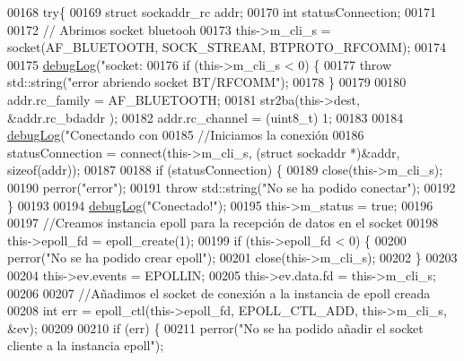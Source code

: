 \begin{DoxyCode}
{{{{00168         \textcolor{keywordflow}{try}\{
00169             \textcolor{keyword}{struct }sockaddr\_rc addr;
00170             \textcolor{keywordtype}{int} statusConnection;
00171 
00172             \textcolor{comment}{// Abrimos socket bluetooh}
00173             this->m\_cli\_s = socket(AF\_BLUETOOTH, SOCK\_STREAM, BTPROTO\_RFCOMM);
00174 
00175             \hyperlink{debug_8hpp_a55f41cf7b0585224496de3d7adbc101c}{debugLog}(\textcolor{stringliteral}{"socket: %
00176             \textcolor{keywordflow}{if} (this->m\_cli\_s < 0) \{
00177                 \textcolor{keywordflow}{throw} std::string(\textcolor{stringliteral}{"error abriendo socket BT/RFCOMM"});
00178             \}
00179 
00180             addr.rc\_family = AF\_BLUETOOTH;
00181             str2ba(this->dest, &addr.rc\_bdaddr );
00182             addr.rc\_channel = (uint8\_t) 1;
00183 
00184             \hyperlink{debug_8hpp_a55f41cf7b0585224496de3d7adbc101c}{debugLog}(\textcolor{stringliteral}{"Conectando con %
00185             \textcolor{comment}{//Iniciamos la conexión}
00186             statusConnection = connect(this->m\_cli\_s, (\textcolor{keyword}{struct} sockaddr *)&addr, \textcolor{keyword}{sizeof}(addr));
00187 
00188             \textcolor{keywordflow}{if} (statusConnection) \{
00189                 close(this->m\_cli\_s);
00190                 perror(\textcolor{stringliteral}{"error"});
00191                 \textcolor{keywordflow}{throw} std::string(\textcolor{stringliteral}{"No se ha podido conectar"});
00192             \}
00193 
00194             \hyperlink{debug_8hpp_a55f41cf7b0585224496de3d7adbc101c}{debugLog}(\textcolor{stringliteral}{"Conectado!"});
00195             this->m\_status = \textcolor{keyword}{true};
00196 
00197             \textcolor{comment}{//Creamos instancia epoll para la recepción de datos en el socket}
00198             this->epoll\_fd = epoll\_create(1);
00199             \textcolor{keywordflow}{if} (this->epoll\_fd < 0) \{
00200                 perror(\textcolor{stringliteral}{"No se ha podido crear epoll"});
00201                 close(this->m\_cli\_s);
00202             \}
00203 
00204             this->ev.events = EPOLLIN;
00205             this->ev.data.fd = this->m\_cli\_s;
00206 
00207             \textcolor{comment}{//Añadimos el socket de conexión a la instancia de epoll creada}
00208             \textcolor{keywordtype}{int} err = epoll\_ctl(this->epoll\_fd, EPOLL\_CTL\_ADD, this->m\_cli\_s, &ev);
00209             
00210             \textcolor{keywordflow}{if} (err) \{
00211                 perror(\textcolor{stringliteral}{"No se ha podido añadir el socket cliente a la instancia epoll"});
}}}}}}
\end{DoxyCode}
